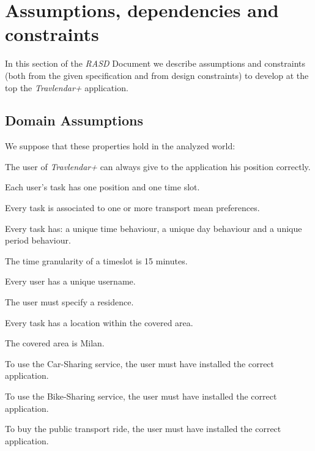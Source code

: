 \section{Assumptions, dependencies and constraints}
In this section of the \emph{RASD} Document we describe assumptions and constraints (both from the given specification and from design constraints) to develop at the top the \emph{Travlendar+} application.

\subsection{Domain Assumptions}
We suppose that these properties hold in the analyzed world:
\begin{domainList}

\item The user of \emph{Travlendar+} can always give to the application his position correctly.

\item Each user's task has one position and one time slot.

\item Every task is associated to one or more transport mean preferences.

\item Every task has: a unique time behaviour, a unique day behaviour and a unique period behaviour.

\item The time granularity of a timeslot is 15 minutes.

\item Every user has a unique username.

\item The user must specify a residence.

\item Every task has a location within the covered area.

\item The covered area is Milan.

\item To use the Car-Sharing service, the user must have installed the correct application.

\item To use the Bike-Sharing service, the user must have installed the correct application.

\item To buy the public transport ride, the user must have installed the correct application.


\end{domainList}
